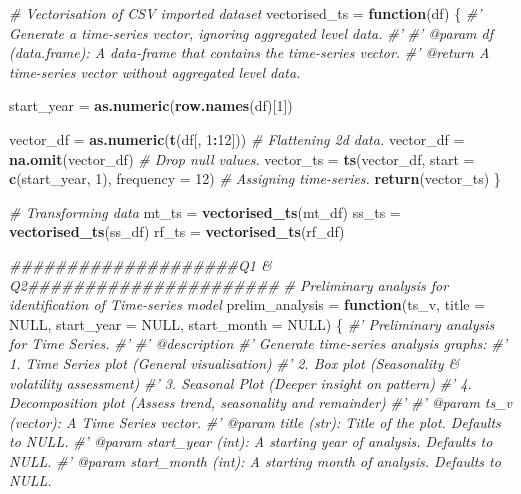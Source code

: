 \documentclass[
  11pt,
]{article}
\newenvironment{Shaded}{\begin{snugshade}}{\end{snugshade}}
\newcommand{\CommentTok}[1]{\textcolor[rgb]{0.56,0.35,0.01}{\textit{#1}}}
\newcommand{\ControlFlowTok}[1]{\textcolor[rgb]{0.13,0.29,0.53}{\textbf{#1}}}
\newcommand{\DataTypeTok}[1]{\textcolor[rgb]{0.13,0.29,0.53}{#1}}
\newcommand{\DecValTok}[1]{\textcolor[rgb]{0.00,0.00,0.81}{#1}}
\newcommand{\KeywordTok}[1]{\textcolor[rgb]{0.13,0.29,0.53}{\textbf{#1}}}
\newcommand{\NormalTok}[1]{#1}
\newcommand{\OperatorTok}[1]{\textcolor[rgb]{0.81,0.36,0.00}{\textbf{#1}}}
\newcommand{\OtherTok}[1]{\textcolor[rgb]{0.56,0.35,0.01}{#1}}
\newcommand{\StringTok}[1]{\textcolor[rgb]{0.31,0.60,0.02}{#1}}
\begin{document}
\begin{Shaded}
\begin{Highlighting}[]
\CommentTok{# Vectorisation of CSV imported dataset}
\NormalTok{vectorised_ts =}\StringTok{ }\ControlFlowTok{function}\NormalTok{(df) \{}
  \CommentTok{#' Generate a time-series vector, ignoring aggregated level data.}
  \CommentTok{#'}
  \CommentTok{#' @param df (data.frame): A data-frame that contains the time-series vector.}
  \CommentTok{#' @return A time-series vector without aggregated level data.}
  
\NormalTok{  start_year =}\StringTok{ }\KeywordTok{as.numeric}\NormalTok{(}\KeywordTok{row.names}\NormalTok{(df)[}\DecValTok{1}\NormalTok{])}
  
  
\NormalTok{  vector_df =}\StringTok{ }\KeywordTok{as.numeric}\NormalTok{(}\KeywordTok{t}\NormalTok{(df[, }\DecValTok{1}\OperatorTok{:}\DecValTok{12}\NormalTok{])) }\CommentTok{# Flattening 2d data.}
\NormalTok{  vector_df =}\StringTok{ }\KeywordTok{na.omit}\NormalTok{(vector_df) }\CommentTok{# Drop null values.}
\NormalTok{  vector_ts =}\StringTok{ }\KeywordTok{ts}\NormalTok{(vector_df,}
                 \DataTypeTok{start =} \KeywordTok{c}\NormalTok{(start_year, }\DecValTok{1}\NormalTok{),}
                 \DataTypeTok{frequency =} \DecValTok{12}\NormalTok{) }\CommentTok{# Assigning time-series.}
  \KeywordTok{return}\NormalTok{(vector_ts)}
\NormalTok{\}}

\CommentTok{# Transforming data}
\NormalTok{mt_ts =}\StringTok{ }\KeywordTok{vectorised_ts}\NormalTok{(mt_df)}
\NormalTok{ss_ts =}\StringTok{ }\KeywordTok{vectorised_ts}\NormalTok{(ss_df)}
\NormalTok{rf_ts =}\StringTok{ }\KeywordTok{vectorised_ts}\NormalTok{(rf_df)}

\CommentTok{####################Q1 & Q2######################}
\CommentTok{# Preliminary analysis for identification of Time-series model}
\NormalTok{prelim_analysis =}\StringTok{ }\ControlFlowTok{function}\NormalTok{(ts_v,}
                           \DataTypeTok{title =} \OtherTok{NULL}\NormalTok{,}
                           \DataTypeTok{start_year =} \OtherTok{NULL}\NormalTok{,}
                           \DataTypeTok{start_month =} \OtherTok{NULL}\NormalTok{) \{}
  \CommentTok{#' Preliminary analysis for Time Series.}
  \CommentTok{#' }
  \CommentTok{#' @description}
  \CommentTok{#' Generate time-series analysis graphs:}
  \CommentTok{#' 1. Time Series plot (General visualisation)}
  \CommentTok{#' 2. Box plot (Seasonality & volatility assessment)}
  \CommentTok{#' 3. Seasonal Plot (Deeper insight on pattern)}
  \CommentTok{#' 4. Decomposition plot (Assess trend, seasonality and remainder)}
  \CommentTok{#'}
  \CommentTok{#' @param ts_v (vector): A Time Series vector.}
  \CommentTok{#' @param title (str): Title of the plot. Defaults to NULL.}
  \CommentTok{#' @param start_year (int): A starting year of analysis. Defaults to NULL.}
  \CommentTok{#' @param start_month (int): A starting month of analysis. Defaults to NULL.}
  

\end{Highlighting}
\end{Shaded}
\end{document}
